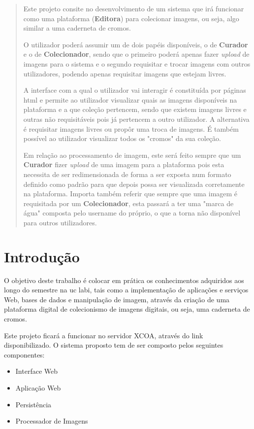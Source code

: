 \documentclass{report}
\begin{document}
\begin{abstract}
Este projeto consite no desenvolvimento de um sistema que irá funcionar como uma plataforma (\textbf{Editora}) para colecionar imagens, ou seja, algo similar a uma caderneta de cromos.

O utilizador poderá assumir um de dois papéis disponíveis, o de \textbf{Curador} e o de \textbf{Colecionador}, sendo que o primeiro poderá apenas fazer \textit{upload} de imagens para o sistema e o segundo requisitar e trocar imagens com outros utilizadores, podendo apenas requisitar imagens que estejam livres.

A interface com a qual o utilizador vai interagir é constituída por páginas \ac{html} e permite ao utilizador visualizar quais as imagens disponíveis na plataforma e a que coleção pertencem, sendo que existem imagens livres e outras não requisitáveis pois já pertencem a outro utilizador. A alternativa é requisitar imagens livres ou propôr uma troca de imagens. É também possível ao utilizador visualizar todos os "cromos" da sua coleção.

Em relação ao processamento de imagem, este será feito sempre que um \textbf{Curador} fizer \textit{upload} de uma imagem para a plataforma pois esta necessita de ser redimensionada de forma a ser exposta num formato definido como padrão para que depois possa ser visualizada corretamente na plataforma. Importa também referir que sempre que uma imagem é requisitada por um \textbf{Colecionador}, esta passará a ter uma "marca de água" composta pelo username do próprio, o que a torna não disponível para outros utilizadores.
\end{abstract}

\tableofcontents
\listoffigures


\clearpage
{}

\chapter{Introdução}
\label{chap.introducao}

O objetivo deste trabalho é colocar em prática os conhecimentos adquiridos aos longo do semestre na \ac{uc} \ac{labi}, tais como a implementação de aplicações e serviços Web, bases de dados e manipulação de imagem, através da criação de uma plataforma digital de colecionismo de imagens digitais, ou seja, uma caderneta de cromos. 

Este projeto ficará a funcionar no servidor XCOA, através do link disponibilizado.
O sistema proposto tem de ser composto pelos seguintes componentes:
\begin{itemize}
	\item Interface Web
	\item Aplicação Web
	\item Persistência
	\item Processador de Imagens
\end{itemize}
\end{document}

